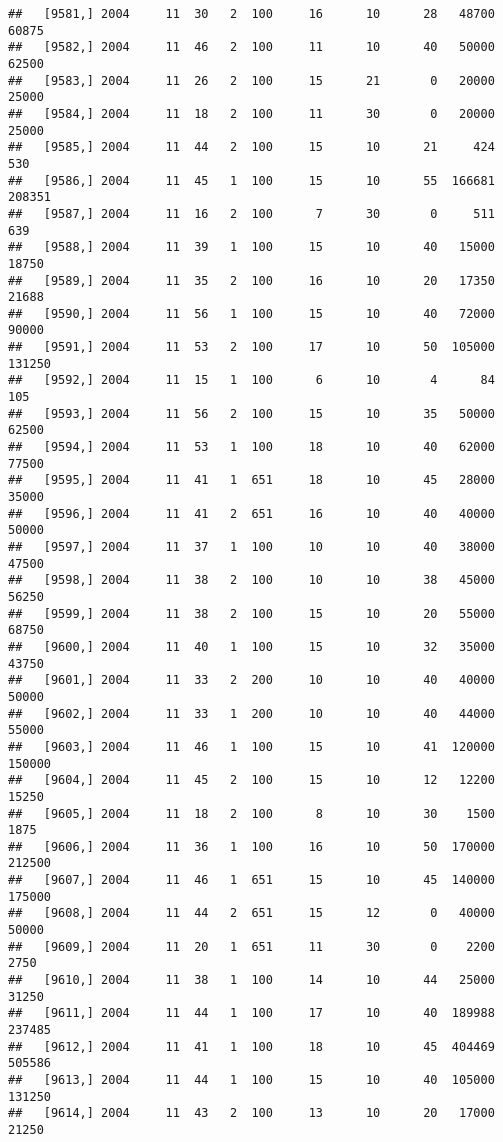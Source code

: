 \documentclass{article}\usepackage[]{graphicx}\usepackage[]{color}
\makeatletter
\newenvironment{kframe}{%
 \def\at@end@of@kframe{}%
 \ifinner\ifhmode%
  \def\at@end@of@kframe{\end{minipage}}%
  \begin{minipage}{\columnwidth}%
 \fi\fi%
 \def\FrameCommand##1{\hskip\@totalleftmargin \hskip-\fboxsep
 \colorbox{shadecolor}{##1}\hskip-\fboxsep
     \hskip-\linewidth \hskip-\@totalleftmargin \hskip\columnwidth}%
 \MakeFramed {\advance\hsize-\width
   \@totalleftmargin\z@ \linewidth\hsize
   \@setminipage}}%
 {\par\unskip\endMakeFramed%
 \at@end@of@kframe}
\newenvironment{knitrout}{}{} %
\makeatother
\begin{document}
\begin{knitrout}
\begin{kframe}
\begin{verbatim}
##   [9581,] 2004     11  30   2  100     16      10      28   48700   60875
##   [9582,] 2004     11  46   2  100     11      10      40   50000   62500
##   [9583,] 2004     11  26   2  100     15      21       0   20000   25000
##   [9584,] 2004     11  18   2  100     11      30       0   20000   25000
##   [9585,] 2004     11  44   2  100     15      10      21     424     530
##   [9586,] 2004     11  45   1  100     15      10      55  166681  208351
##   [9587,] 2004     11  16   2  100      7      30       0     511     639
##   [9588,] 2004     11  39   1  100     15      10      40   15000   18750
##   [9589,] 2004     11  35   2  100     16      10      20   17350   21688
##   [9590,] 2004     11  56   1  100     15      10      40   72000   90000
##   [9591,] 2004     11  53   2  100     17      10      50  105000  131250
##   [9592,] 2004     11  15   1  100      6      10       4      84     105
##   [9593,] 2004     11  56   2  100     15      10      35   50000   62500
##   [9594,] 2004     11  53   1  100     18      10      40   62000   77500
##   [9595,] 2004     11  41   1  651     18      10      45   28000   35000
##   [9596,] 2004     11  41   2  651     16      10      40   40000   50000
##   [9597,] 2004     11  37   1  100     10      10      40   38000   47500
##   [9598,] 2004     11  38   2  100     10      10      38   45000   56250
##   [9599,] 2004     11  38   2  100     15      10      20   55000   68750
##   [9600,] 2004     11  40   1  100     15      10      32   35000   43750
##   [9601,] 2004     11  33   2  200     10      10      40   40000   50000
##   [9602,] 2004     11  33   1  200     10      10      40   44000   55000
##   [9603,] 2004     11  46   1  100     15      10      41  120000  150000
##   [9604,] 2004     11  45   2  100     15      10      12   12200   15250
##   [9605,] 2004     11  18   2  100      8      10      30    1500    1875
##   [9606,] 2004     11  36   1  100     16      10      50  170000  212500
##   [9607,] 2004     11  46   1  651     15      10      45  140000  175000
##   [9608,] 2004     11  44   2  651     15      12       0   40000   50000
##   [9609,] 2004     11  20   1  651     11      30       0    2200    2750
##   [9610,] 2004     11  38   1  100     14      10      44   25000   31250
##   [9611,] 2004     11  44   1  100     17      10      40  189988  237485
##   [9612,] 2004     11  41   1  100     18      10      45  404469  505586
##   [9613,] 2004     11  44   1  100     15      10      40  105000  131250
##   [9614,] 2004     11  43   2  100     13      10      20   17000   21250

\end{verbatim}
\end{kframe}
\end{knitrout}
\end{document}
